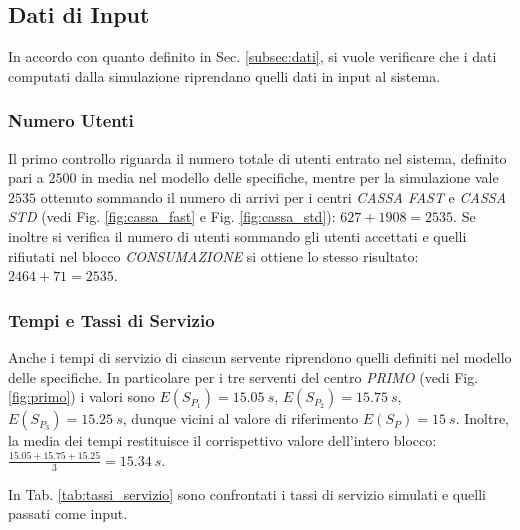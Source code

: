 \documentclass{article}
\begin{document}

\subsection{Dati di Input}

In accordo con quanto definito in Sec. \ref{subsec:dati}, si vuole verificare che i dati computati dalla simulazione riprendano quelli dati in input al sistema.

\subsubsection{Numero Utenti}

Il primo controllo riguarda il numero totale di utenti entrato nel sistema, definito pari a $2500$ in media nel modello delle specifiche, mentre per la simulazione vale $2535$ ottenuto sommando il numero di arrivi per i centri \textit{CASSA FAST} e \textit{CASSA STD} (vedi Fig. \ref{fig:cassa_fast} e Fig. \ref{fig:cassa_std}): $627 + 1908 = 2535$. Se inoltre si verifica il numero di utenti sommando gli utenti accettati e quelli rifiutati nel blocco \textit{CONSUMAZIONE} si ottiene lo stesso risultato: $ 2464 + 71 = 2535 $.
\subsubsection{Tempi e Tassi di Servizio}

Anche i tempi di servizio di ciascun servente riprendono quelli definiti nel modello delle specifiche. In particolare per i tre serventi del centro \textit{PRIMO} (vedi Fig. \ref{fig:primo}) i valori sono $E(S_{P_1}) = 15.05\ s$, $E(S_{P_2}) = 15.75\ s$, $E(S_{P_3}) = 15.25\ s$, dunque vicini al valore di riferimento $E(S_P) = 15\ s$. Inoltre, la media dei tempi restituisce il corrispettivo valore dell'intero blocco: $\frac{15.05 + 15.75 + 15.25}{3} = 15.34\ s$. 

In Tab. \ref{tab:tassi_servizio} sono confrontati i tassi di servizio simulati e quelli passati come input.
\end{document}
